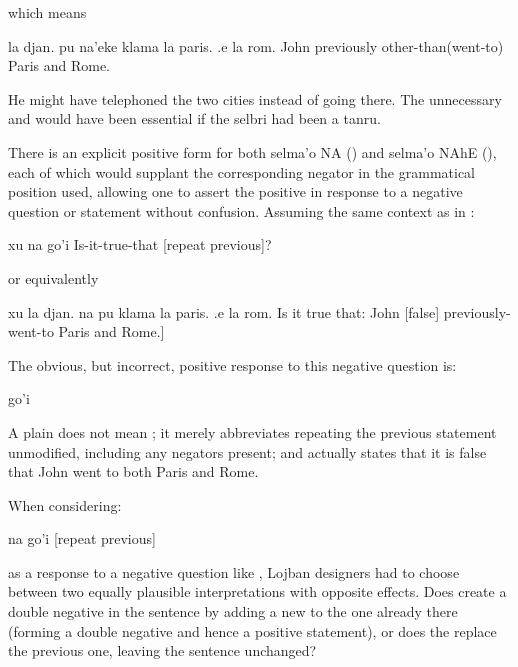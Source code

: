 {\noindent}which means
\begin{example}
la djan.  pu na'eke klama\n
\T	[ke'e] la paris. .e la rom.\n
John previously other-than(went-to)\n
\T	[both] Paris and Rome.
\end{example}

He might have telephoned the two cities instead of going
    there. The unnecessary  and  would have been
    essential if the selbri had been a tanru.



There is an explicit positive form for both selma'o NA
    () and selma'o NAhE (), each of which would
    supplant the corresponding negator in the grammatical position
    used, allowing one to assert the positive in response to a
    negative question or statement without confusion. Assuming the
    same context as in :
\begin{example}
xu na go'i\n
Is-it-true-that  [repeat previous]?
\end{example}

{\noindent}or equivalently
\begin{example}
xu la djan.  na pu klama\n
\T	la paris. .e la rom.\n
Is it true that: John [false] previously-went-to\n
\T	[both] Paris and Rome.]
\end{example}

The obvious, but incorrect, positive response to this
    negative question is:
\begin{example}
go'i\n
{}
\end{example}

A plain  does not mean ; it merely
    abbreviates repeating the previous statement unmodified,
    including any negators present; and  actually states that it is false that John went to both
    Paris and Rome.

When considering:
\begin{example}
na go'i\n
{} [repeat previous]
\end{example}

{\noindent}as a response to a negative question like , Lojban designers had to choose
    between two equally plausible interpretations with opposite
    effects. Does  create a double
    negative in the sentence by adding a new  to the one
    already there (forming a double negative and hence a positive
    statement), or does the  replace the previous one,
    leaving the sentence unchanged? 

